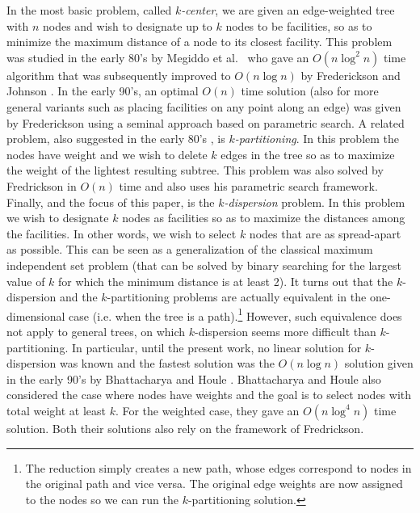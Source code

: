 \documentclass[11pt,a4paper]{article}
\newcommand{\Oh}{{O}}
\theoremstyle{definition}
\theoremstyle{remark}
\begin{document}
In the most basic problem, called \emph{$k$-center}, we are given an edge-weighted tree with $n$ nodes and wish to designate up to $k$ nodes to be facilities, so as to minimize the maximum distance of a node to its closest facility. This problem was studied in the early 80's by Megiddo et al.~\cite{Megiddo1981} who gave an $\Oh(n\log^2n)$ time algorithm that was subsequently improved to $\Oh(n\log n)$ by Frederickson and Johnson \cite{Frederickson1983}. In the early 90's, an optimal $\Oh(n)$ time solution (also for more general variants such as placing facilities on any point along an edge) was given by Frederickson \cite{Frederickson1991a} using a seminal approach based on parametric search. 
%
A related problem, also suggested in the early 80's  \cite{Becker1982,Perl1981}, is \emph{$k$-partitioning}. In this problem the nodes have weight and we wish to delete $k$ edges in the tree so as to maximize the weight of the lightest resulting subtree. This problem was also solved by Fredrickson in $\Oh(n)$ time \cite{Frederickson1991} and also uses his parametric search framework. 
%
Finally, and the focus of this paper, is the  {\em $k$-dispersion} problem. In this problem we wish to designate $k$ nodes as facilities so as to maximize the distances among the facilities.  In other words, we wish to select $k$ nodes that are as spread-apart as possible. This can be seen as a generalization of the classical maximum independent set problem (that can be solved by binary searching for the largest value of $k$ for which the minimum distance is at least 2).  
%
It turns out that the $k$-dispersion and the $k$-partitioning problems are actually equivalent in the one-dimensional case (i.e. when the tree is a path).\footnote{The reduction simply creates a new path, whose edges correspond to nodes in the original path and vice versa. The original edge weights are now assigned to the nodes so we can run the $k$-partitioning solution.} However, such equivalence does not apply to general trees, on which $k$-dispersion seems more difficult than $k$-partitioning. In particular, until the present work, no linear solution for $k$-dispersion was known and the fastest solution was the $O(n \log n)$ solution given in the early 90's by Bhattacharya and Houle \cite{Bhattacharya1991}. Bhattacharya and Houle also considered the case where nodes have weights and the goal is to select nodes with total weight at least $k$. For the weighted case, they gave an $\Oh(n\log^4 n)$ time solution. Both their solutions also rely on the framework of Fredrickson.
\end{document}

